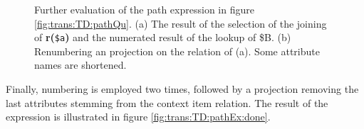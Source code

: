 \begin{myExample}
\begin{figure}[h]
\centering
{}
\quad
{}
\caption[Further evaluation of the path expression]{Further evaluation of the path expression in figure
\ref{fig:trans:TD:pathQu}. (a) The result of the selection of the joining of \textbf{r(}\texttt{\$a}\textbf{)} and
the numerated result of the lookup of \textsf{\$B}. (b) Renumbering an projection on the relation of (a). Some
attribute names are shortened.}
\end{figure}

Finally, numbering is employed two times, followed by a projection removing the last attributes stemming from the
context item relation. The result of the expression is illustrated in figure \ref{fig:trans:TD:pathEx:done}.

\end{myExample}

